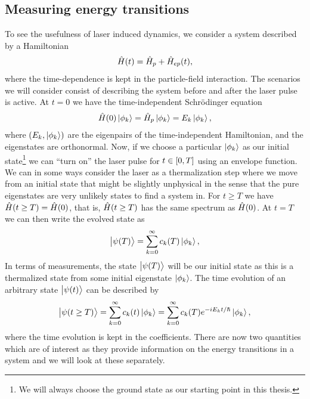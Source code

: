         \subsection{Measuring energy transitions}
            To see the usefulness of laser induced dynamics, we consider a
            system described by a Hamiltonian
            \begin{align}
                \hat{H}(t)
                = \hat{H}_p + \hat{H}_{ep}(t),
            \end{align}
            where the time-dependence is kept in the particle-field interaction.
            The scenarios we will consider consist of describing the system
            before and after the laser pulse is active.
            At $t = 0$ we have the time-independent Schrödinger equation
            \begin{align}
                \hat{H}(0)\ket{\phi_k}
                = \hat{H}_p\ket{\phi_k}
                = E_k\ket{\phi_k},
            \end{align}
            where $(E_k, \ket{\phi_k})$ are the eigenpairs of the
            time-independent Hamiltonian, and the eigenstates are orthonormal.
            Now, if we choose a particular $\ket{\phi_k}$ as our initial
            state\footnote{%
                We will always choose the ground state as our starting point in
                this thesis.
            } we can ``turn on'' the laser pulse for $t \in \left[ 0, T \right]$ using
            an envelope function.
            We can in some ways consider the laser as a thermalization step where
            we move from an initial state that might be slightly unphysical in
            the sense that the pure eigenstates are very unlikely states to find
            a system in.
            For $t \geq T$ we have $\hat{H}(t \geq T) = \hat{H}(0)$, that is,
            $\hat{H}(t \geq T)$ has the same spectrum as $\hat{H}(0)$.
            At $t = T$ we can then write the evolved state as
            \begin{align}
                \ket{\psi(T)} = \sum_{k = 0}^{\infty}
                c_k(T) \ket{\phi_k},
            \end{align}
            In terms of measurements, the state $\ket{\psi(T)}$ will be our
            initial state as this is a thermalized state from some initial
            eigenstate $\ket{\phi_k}$.
            The time evolution of an arbitrary state $\ket{\psi(t)}$ can be
            described by
            \begin{align}
                \ket{\psi(t \geq T)}
                = \sum_{k = 0}^{\infty} c_k(t)\ket{\phi_k}
                = \sum_{k = 0}^{\infty}
                c_k(T) e^{-iE_k t/\hslash}\ket{\phi_k},
            \end{align}
            where the time evolution is kept in the coefficients.
            There are now two quantities which are of interest as they provide
            information on the energy transitions in a system and we will look
            at these separately.

